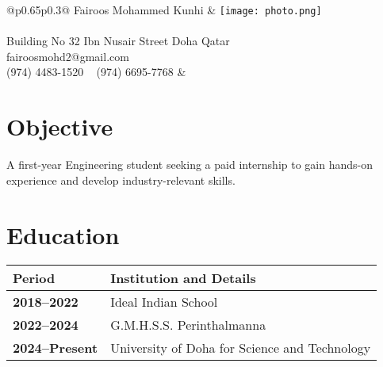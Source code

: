 \documentclass[a4paper, oneside, final]{scrartcl} %
\begin{document}
\begin{center}


\begin{tabular}{@{}p{0.65\textwidth}p{0.3\textwidth}@{}}
    \vspace{-2.0cm} %
    {\fontsize{36}{36}\selectfont\rmfamily Fairoos Mohammed Kunhi} & 
    \texttt{[image: photo.png]} \\ \\
    {\fontsize{12.5}{17}\selectfont
        Building No 32 {\large\textperiodcentered} Ibn Nusair Street {\large\textperiodcentered} Doha {\large\textperiodcentered} Qatar \\
        {\Large\Letter} fairoosmohd2@gmail.com \\ 
        {\Large\Telefon} (974) 4483-1520 \ {\Large\Mobilefone} (974) 6695-7768
    } & \\ 
\end{tabular}

\vspace{1.5cm} %


\section{Objective}

A first-year Engineering student seeking a paid internship to gain hands-on experience and develop industry-relevant skills.


\section{Education}

\begin{tabularx}{0.97\linewidth}{>{\raggedleft\bfseries}p{2.5cm}X}
\rowcolor[gray]{.90} Period & Institution and Details \\ \hline
2018--2022 & Ideal Indian School \\
2022--2024 & G.M.H.S.S. Perinthalmanna \\
2024--Present & University of Doha for Science and Technology \\
\end{tabularx}


\end{center}
\end{document}
